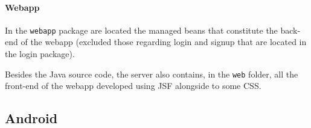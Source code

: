 \paragraph{Webapp}
In the \texttt{webapp} package are located the managed beans that constitute the back-end of the webapp (excluded those regarding login and signup that are located in the login package).

\vspace{1em}
\noindent
Besides the Java source code, the server also contains, in the \texttt{web} folder, all the front-end of the webapp developed using JSF alongside to some CSS.


\subsection{Android}